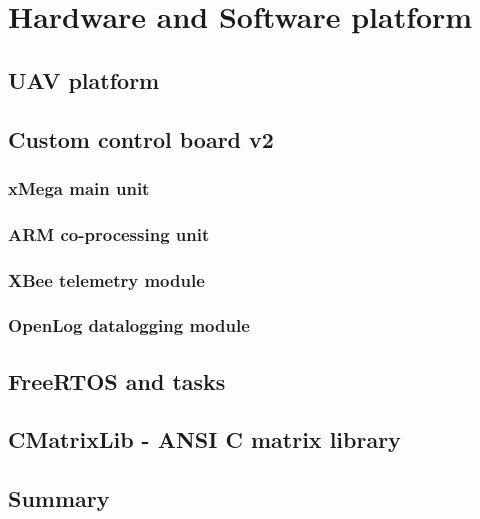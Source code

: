 \section{Hardware and Software platform}

\subsection{UAV platform}

\subsection{Custom control board v2}

\subsubsection{xMega main unit}

\subsubsection{ARM co-processing unit}

\subsubsection{XBee telemetry module}

\subsubsection{OpenLog datalogging module}

\subsection{FreeRTOS and tasks}

\subsection{CMatrixLib - ANSI C matrix library}

\subsection{Summary}